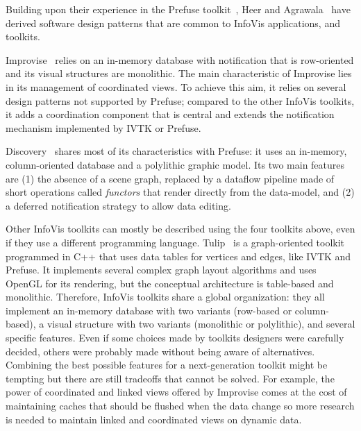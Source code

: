 Building upon their experience in the Prefuse toolkit~\cite{Prefuse},
Heer and Agrawala~\cite{DesignPatternsIV} have derived software design
patterns that are common to InfoVis applications, and toolkits. 

Improvise~\cite{Improvise} relies on an in-memory database with
notification that is row-oriented and its visual structures are
monolithic.  The main characteristic of Improvise lies in its
management of coordinated views.  To achieve this aim, it relies on several
design patterns not supported by Prefuse; compared to the other
InfoVis toolkits, it adds a coordination component
that is central and extends the notification mechanism implemented
by IVTK or Prefuse.

Discovery~\cite{Discovery2,Discovery1,Discovery3} shares most of its
characteristics with Prefuse: it uses an in-memory, column-oriented
database and a polylithic graphic model. Its two main features are (1)
the absence of a scene graph, replaced by a dataflow pipeline made of
short operations called \emph{functors} that render directly from the
data-model, and (2) a deferred notification strategy to allow data
editing.


Other InfoVis toolkits can mostly be described using the four toolkits
above, even if they use a different programming language.
Tulip~\cite{Tulip} is a graph-oriented toolkit programmed in C++ that
uses data tables for vertices and edges, like IVTK and Prefuse.  It
implements several complex graph layout algorithms and uses OpenGL for
its rendering, but the conceptual architecture is table-based and
monolithic.  Therefore, InfoVis toolkits share a
global organization: they all implement an in-memory database with two
variants (row-based or column-based), a visual structure with two
variants (monolithic or polylithic), and several specific features.
Even if some choices made by toolkits designers were carefully
decided, others were probably made without being aware of alternatives.
Combining the best possible features for a next-generation toolkit
might be tempting but there are still tradeoffs that cannot be solved.
For example, the power of coordinated and linked views offered by
Improvise comes at the cost of maintaining caches that should be
flushed when the data change so more research is needed to maintain
linked and coordinated views on dynamic data.

